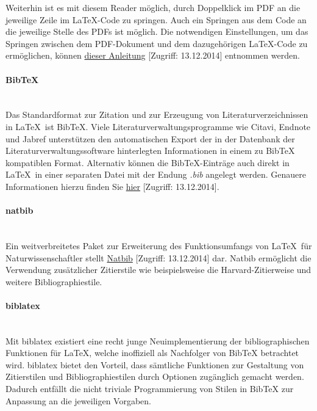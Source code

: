 Weiterhin ist es mit diesem Reader möglich, durch Doppelklick im PDF an die jeweilige Zeile im \LaTeX-Code zu springen. Auch ein Springen aus dem Code an die jeweilige Stelle des PDFs ist möglich. Die notwendigen Einstellungen, um das Springen zwischen dem PDF-Dokument und dem dazugehörigen \LaTeX-Code zu ermöglichen, können \href{http://robjhyndman.com/hyndsight/texstudio-sumatrapdf/}{dieser Anleitung} [Zugriff: 13.12.2014] entnommen werden.

\paragraph{BibTeX}\noindent\\
Das Standardformat zur Zitation und zur Erzeugung von Literaturverzeichnissen in \LaTeX\ ist BibTeX. Viele Literaturverwaltungsprogramme wie Citavi, Endnote und Jabref unterstützen den automatischen Export der in der Datenbank der Literaturverwaltungssoftware hinterlegten Informationen in einem zu BibTeX kompatiblen Format.
Alternativ können die BibTeX-Einträge auch direkt in \LaTeX\ in einer separaten Datei mit der Endung \emph{.bib} angelegt werden. Genauere Informationen hierzu finden Sie  \href{http://en.wikibooks.org/wiki/LaTeX/Bibliography_Management\#BibTeX}{hier} [Zugriff: 13.12.2014].

\paragraph{natbib}\noindent\\
Ein weitverbreitetes Paket zur Erweiterung des Funktionsumfangs von \LaTeX\ für Naturwissenschaftler stellt \href{http://ftp.gwdg.de/pub/ctan/macros/latex/contrib/natbib/natbib.pdf}{Natbib} [Zugriff: 13.12.2014] dar. Natbib ermöglicht die Verwendung zusätzlicher Zitierstile wie beispielsweise die \glqq Harvard\grqq-Zitierweise und weitere Bibliographiestile.

\paragraph{biblatex}\noindent\\
Mit biblatex existiert eine recht junge Neuimplementierung der bibliographischen Funktionen für \LaTeX, welche inoffiziell als Nachfolger von BibTeX betrachtet wird. biblatex bietet den Vorteil, dass sämtliche Funktionen zur Gestaltung von Zitierstilen und Bibliographiestilen durch Optionen zugänglich gemacht werden. Dadurch entfällt die nicht triviale Programmierung von Stilen in BibTeX zur Anpassung an die jeweiligen Vorgaben.

